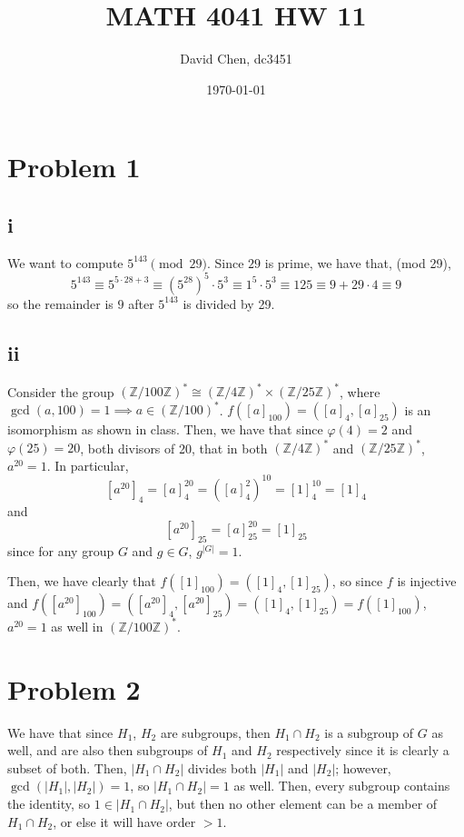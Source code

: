 \documentclass[12pt,letterpaper]{article}
\title{MATH 4041 HW 11}
\author{David Chen, dc3451}
\date{\today}
\theoremstyle{definition}
\newcommand{\Z}{\mathbb{Z}}
\begin{document}
\maketitle

\section*{Problem 1}

\subsection*{i}
We want to compute $5^{143} \pmod{29}$. Since $29$ is prime, we have that, (mod 29),
\[
  5^{143} \equiv 5^{5 \cdot 28 + 3} \equiv (5^{28})^{5} \cdot 5^{3} \equiv 1^{5} \cdot 5^{3} \equiv 125 \equiv 9 + 29 \cdot 4 \equiv 9
\]
so the remainder is $9$ after $5^{143}$ is divided by 29.

\subsection*{ii}

Consider the group $(\Z/100\Z)^{*} \cong (\Z/4\Z)^{*} \times (\Z/25\Z)^{*}$, where $\gcd(a, 100) = 1 \implies a \in (\Z/100)^{*}$. $f([a]_{100}) = ([a]_{4}, [a]_{25})$ is an isomorphism as shown in class. Then, we have that since $\varphi(4) = 2$ and $\varphi(25) = 20$, both divisors of 20, that in both $(\Z/4\Z)^{*}$ and $(\Z/25\Z)^{*}$, $a^{20} = 1$. In particular,
\[
  [a^{20}]_{4} = [a]_{4}^{20} = ([a]_{4}^{2})^{10} = [1]_{4}^{10} = [1]_{4}
\]
and
\[
  [a^{20}]_{25} = [a]_{25}^{20} = [1]_{25}
\]
since for any group $G$ and $g \in G$, $g^{|G|} = 1$.

Then, we have clearly that $f([1]_{100}) = ([1]_{4}, [1]_{25})$, so since $f$ is injective and $f([a^{20}]_{100}) = ([a^{20}]_{4},[a^{20}]_{25}) = ([1]_{4},[1]_{25}) = f([1]_{100})$, $a^{20} = 1$ as well in $(\Z/100\Z)^{*}$.

\section*{Problem 2}

We have that since $H_{1}$, $H_{2}$ are subgroups, then $H_{1} \cap H_{2}$ is a subgroup of $G$ as well, and are also then subgroups of $H_{1}$ and $H_{2}$ respectively since it is clearly a subset of both. Then, $|H_{1} \cap H_{2}|$ divides both $|H_{1}|$ and $|H_{2}|$; however, $\gcd(|H_{1}|, |H_{2}|) = 1$, so $|H_{1} \cap H_{2}| = 1$ as well. Then, every subgroup contains the identity, so $1 \in |H_{1} \cap H_{2}|$, but then no other element can be a member of $H_{1} \cap H_{2}$, or else it will have order $> 1$.
\end{document}
